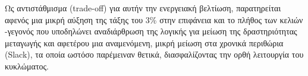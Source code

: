 Ως αντιστάθμισμα (trade-off) για αυτήν την ενεργειακή βελτίωση, παρατηρείται αφενός μια μικρή αύξηση της τάξης του 3\% στην επιφάνεια και το πλήθος των κελιών -γεγονός που υποδηλώνει αναδιάρθρωση της λογικής για μείωση της δραστηριότητας μεταγωγής και αφετέρου μια αναμενόμενη, μικρή μείωση στα χρονικά περιθώρια (Slack), τα οποία ωστόσο παρέμειναν θετικά, διασφαλίζοντας την ορθή λειτουργία του κυκλώματος.